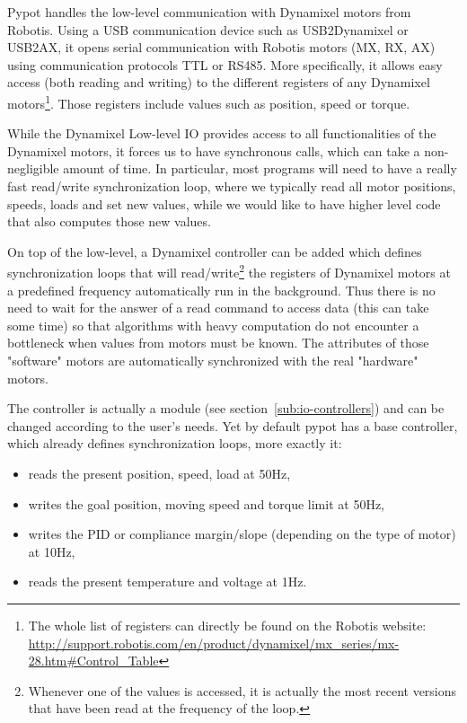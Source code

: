 Pypot handles the low-level communication with Dynamixel motors from Robotis. Using a USB communication device such as USB2Dynamixel or USB2AX, it opens serial communication with Robotis motors (MX, RX, AX) using communication protocols TTL or RS485. More specifically, it allows easy access (both reading and writing) to the different registers of any Dynamixel motors\footnote{The whole list of registers can directly be found on the Robotis website: \url{http://support.robotis.com/en/product/dynamixel/mx_series/mx-28.htm\#Control_Table}}. Those registers include values such as position, speed or torque.


While the Dynamixel Low-level IO provides access to all functionalities of the Dynamixel motors, it forces us to have synchronous calls, which can take a non-negligible amount of time. In particular, most programs will need to have a really fast read/write synchronization loop, where we typically read all motor positions, speeds, loads and set new values, while we would like to have higher level code that also computes those new values.

On top of the low-level, a Dynamixel controller can be added which defines synchronization loops that will read/write\footnote{Whenever one of the values is accessed, it is actually the most recent versions that have been read at the frequency of the loop.} the registers of Dynamixel motors at a predefined frequency automatically run in the background. Thus there is no need to wait for the answer of a read command to access data (this can take some time) so that algorithms with heavy computation do not encounter a bottleneck when values from motors must be known. The attributes of those "software" motors are automatically synchronized with the real "hardware" motors.

The controller is actually a module (see section~\ref{sub:io-controllers}) and can be changed according to the user’s needs. Yet by default pypot has a base controller, which already defines synchronization loops, more exactly it:

\begin{itemize}
    \item reads the present position, speed, load at 50Hz,
    \item writes the goal position, moving speed and torque limit at 50Hz,
    \item writes the PID or compliance margin/slope (depending on the type of motor) at 10Hz,
    \item reads the present temperature and voltage at 1Hz.
\end{itemize}

